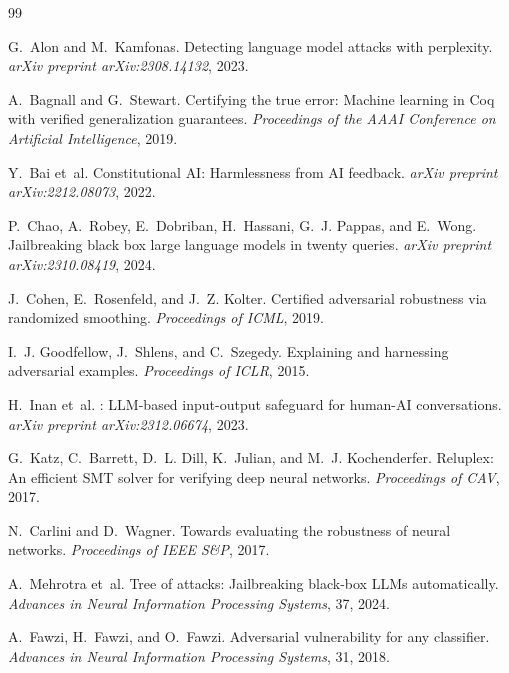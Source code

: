 \documentclass{article}
\begin{document}

\begin{thebibliography}{99}

G.~Alon and M.~Kamfonas.
\newblock Detecting language model attacks with perplexity.
\newblock \emph{arXiv preprint arXiv:2308.14132}, 2023.

A.~Bagnall and G.~Stewart.
\newblock Certifying the true error: Machine learning in {Coq} with
  verified generalization guarantees.
\newblock \emph{Proceedings of the AAAI Conference on Artificial
Intelligence}, 2019.

Y.~Bai et~al.
\newblock Constitutional {AI}: Harmlessness from {AI} feedback.
\newblock \emph{arXiv preprint arXiv:2212.08073}, 2022.

P.~Chao, A.~Robey, E.~Dobriban, H.~Hassani, G.~J. Pappas, and
E.~Wong.
\newblock Jailbreaking black box large language models in twenty queries.
\newblock \emph{arXiv preprint arXiv:2310.08419}, 2024.

J.~Cohen, E.~Rosenfeld, and J.~Z. Kolter.
\newblock Certified adversarial robustness via randomized smoothing.
\newblock \emph{Proceedings of ICML}, 2019.

I.~J. Goodfellow, J.~Shlens, and C.~Szegedy.
\newblock Explaining and harnessing adversarial examples.
\newblock \emph{Proceedings of ICLR}, 2015.

H.~Inan et~al.
: {LLM}-based input-output safeguard for
  human-{AI} conversations.
\newblock \emph{arXiv preprint arXiv:2312.06674}, 2023.

G.~Katz, C.~Barrett, D.~L. Dill, K.~Julian, and
M.~J. Kochenderfer.
\newblock Reluplex: An efficient {SMT} solver for verifying deep neural
  networks.
\newblock \emph{Proceedings of CAV}, 2017.

N.~Carlini and D.~Wagner.
\newblock Towards evaluating the robustness of neural networks.
\newblock \emph{Proceedings of IEEE S\&P}, 2017.

A.~Mehrotra et~al.
\newblock Tree of attacks: Jailbreaking black-box {LLMs} automatically.
\newblock \emph{Advances in Neural Information Processing Systems}, 37,
2024.

A.~Fawzi, H.~Fawzi, and O.~Fawzi.
\newblock Adversarial vulnerability for any classifier.
\newblock \emph{Advances in Neural Information Processing Systems}, 31, 2018.


\end{thebibliography}
\end{document}
